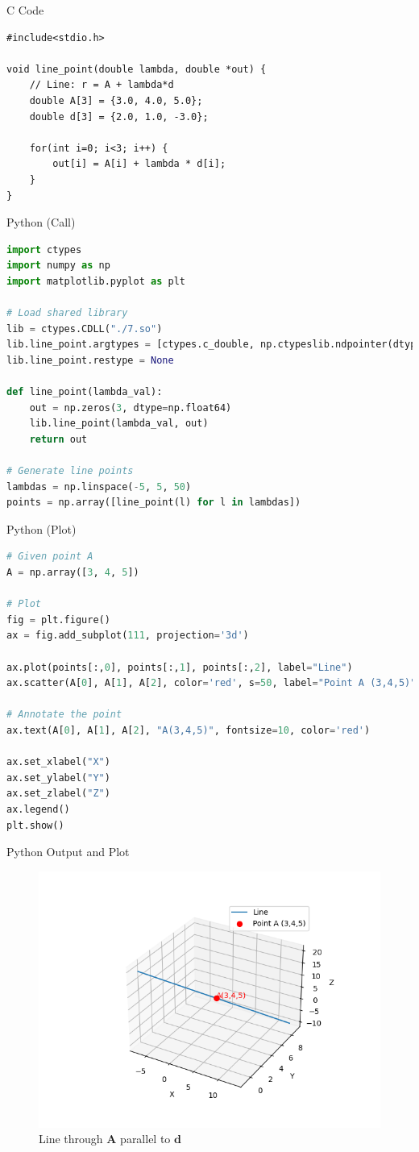 \documentclass{beamer}
\renewcommand{\vec}[1]{\mathbf{#1}}
\begin{document}
\begin{frame}[fragile]{C Code}
\begin{lstlisting}
#include<stdio.h>

void line_point(double lambda, double *out) {
    // Line: r = A + lambda*d
    double A[3] = {3.0, 4.0, 5.0};
    double d[3] = {2.0, 1.0, -3.0};

    for(int i=0; i<3; i++) {
        out[i] = A[i] + lambda * d[i];
    }
}
\end{lstlisting}
\end{frame}
\begin{frame}[fragile]{Python (Call)}
\begin{lstlisting}[language=Python]
import ctypes
import numpy as np
import matplotlib.pyplot as plt

# Load shared library
lib = ctypes.CDLL("./7.so")
lib.line_point.argtypes = [ctypes.c_double, np.ctypeslib.ndpointer(dtype=np.float64)]
lib.line_point.restype = None

def line_point(lambda_val):
    out = np.zeros(3, dtype=np.float64)
    lib.line_point(lambda_val, out)
    return out

# Generate line points
lambdas = np.linspace(-5, 5, 50)
points = np.array([line_point(l) for l in lambdas])
\end{lstlisting}
\end{frame}

\begin{frame}[fragile]{Python (Plot)}
\begin{lstlisting}[language=Python]
# Given point A
A = np.array([3, 4, 5])

# Plot
fig = plt.figure()
ax = fig.add_subplot(111, projection='3d')

ax.plot(points[:,0], points[:,1], points[:,2], label="Line")
ax.scatter(A[0], A[1], A[2], color='red', s=50, label="Point A (3,4,5)")

# Annotate the point
ax.text(A[0], A[1], A[2], "A(3,4,5)", fontsize=10, color='red')

ax.set_xlabel("X")
ax.set_ylabel("Y")
ax.set_zlabel("Z")
ax.legend()
plt.show()

\end{lstlisting}
\end{frame}

\begin{frame}{Python Output and Plot}
\begin{figure}[h!]
\includegraphics[width=0.75\columnwidth]{figs/7.png}
\caption{Line through $\vec{A}$ parallel to $\vec{d}$}
\end{figure}
\end{frame}
\end{document}
